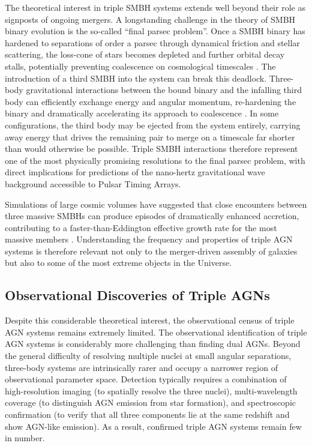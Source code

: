 \documentclass[twocolumn, 10pt]{article}
\begin{document}
The theoretical interest in triple SMBH systems extends well beyond their role as signposts of ongoing mergers. A longstanding challenge in the theory of SMBH binary evolution is the so-called ``final parsec problem''. Once a SMBH binary has hardened to separations of order a parsec through dynamical friction and stellar scattering, the loss-cone of stars becomes depleted and further orbital decay stalls, potentially preventing coalescence on cosmological timescales \citep{Begelman1980}. The introduction of a third SMBH into the system can break this deadlock. Three-body gravitational interactions between the bound binary and the infalling third body can efficiently exchange energy and angular momentum, re-hardening the binary and dramatically accelerating its approach to coalescence \citep[e.g.][]{Bonetti2018}. In some configurations, the third body may be ejected from the system entirely, carrying away energy that drives the remaining pair to merge on a timescale far shorter than would otherwise be possible. Triple SMBH interactions therefore represent one of the most physically promising resolutions to the final parsec problem, with direct implications for predictions of the nano-hertz gravitational wave background accessible to Pulsar Timing Arrays.
 
Simulations of large cosmic volumes have suggested that close encounters between three massive SMBHs can produce episodes of dramatically enhanced accretion, contributing to a faster-than-Eddington effective growth rate for the most massive members \citep[e.g.][]{Ni2022}. Understanding the frequency and properties of triple AGN systems is therefore relevant not only to the merger-driven assembly of galaxies but also to some of the most extreme objects in the Universe.
 
\subsection{Observational Discoveries of Triple AGNs}
\label{subsec:triple_obs}
 
Despite this considerable theoretical interest, the observational census of triple AGN systems remains extremely limited. The observational identification of triple AGN systems is considerably more challenging than finding dual AGNs. Beyond the general difficulty of resolving multiple nuclei at small angular separations, three-body systems are intrinsically rarer and occupy a narrower region of observational parameter space. Detection typically requires a combination of high-resolution imaging (to spatially resolve the three nuclei), multi-wavelength coverage (to distinguish AGN emission from star formation), and spectroscopic confirmation (to verify that all three components lie at the same redshift and show AGN-like emission). As a result, confirmed triple AGN systems remain few in number.
 
\end{document}

